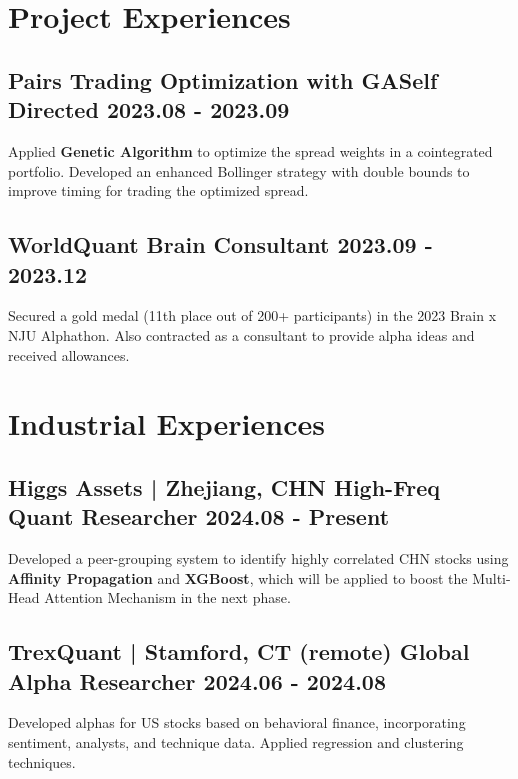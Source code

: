 \documentclass[a4paper]{article}
\begin{document}

\section{Project Experiences} %
\subsection{Pairs Trading Optimization with GA\normalfont \hfill Self Directed \hspace{40pt} 2023.08 - 2023.09}
Applied \textbf{Genetic Algorithm} to optimize the spread weights in a cointegrated portfolio. Developed an enhanced Bollinger strategy with double bounds to improve timing for trading the optimized spread.

\subsection{WorldQuant Brain \normalfont \hfill Consultant\hspace{40pt} 2023.09 - 2023.12}
Secured a gold medal (11th place out of 200+ participants) in the 2023 Brain x NJU Alphathon. Also contracted as a consultant to provide alpha ideas and received allowances.

\section{Industrial Experiences} %
\subsection{Higgs Assets \normalfont | Zhejiang, CHN  \hfill High-Freq Quant Researcher \hspace{40pt} 2024.08 - Present}
Developed a peer-grouping system to identify highly correlated CHN stocks using \textbf{Affinity Propagation} and \textbf{XGBoost}, which will be applied to boost the Multi-Head Attention Mechanism in the next phase. 
\subsection{TrexQuant \normalfont | Stamford, CT (remote) \hfill Global Alpha Researcher \hspace{40pt} 2024.06 - 2024.08}
Developed alphas for US stocks based on behavioral finance, incorporating sentiment, analysts, and technique data. Applied regression and clustering techniques.
\end{document}
